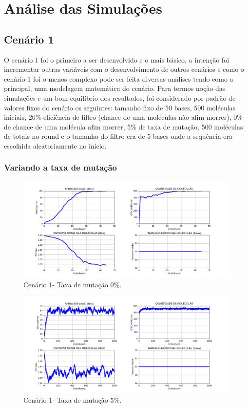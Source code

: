 \section{Análise das Simulações}

\subsection{Cenário 1}
O cenário 1 foi o primeiro a ser desenvolvido e o mais básico, a intenção foi
incrementar outras variáveis com o desenvolvimento de outros cenários e como o cenário
1 foi o menos complexo pode ser feita diversas análises tendo como a principal, uma
modelagem matemática do cenário. Para termos noção das simulações e um bom
equilíbrio dos resultados, foi considerado por padrão de valores fixos do cenário os
seguintes: tamanho fixo de 50 bases, 500 moléculas iniciais, 20\% eficiência de filtro
(chance de uma moléculas não-afim morrer), 0\% de chance de uma molécula afim morrer,
5\% de taxa de mutação, 500 moléculas de totais no round e o tamanho do filtro era de 5
bases onde a sequência era escolhida aleatoriamente no início.

\subsubsection{Variando a taxa de mutação}

\begin{figure}[!h]
    \centering
    \includegraphics[width=15cm]{figures/image1_alpha00_beta_20.png}
    \caption{Cenário 1- Taxa de mutação 0\%.}
    \label{fig:image1_alpha00_beta_20}
\end{figure}

\begin{figure}[!h]
    \centering
    \includegraphics[width=15cm]{figures/image2_alpha05_beta_20.png}
    \caption{Cenário 1- Taxa de mutação 5\%.}
    \label{fig:image2_alpha05_beta_20}
\end{figure}

